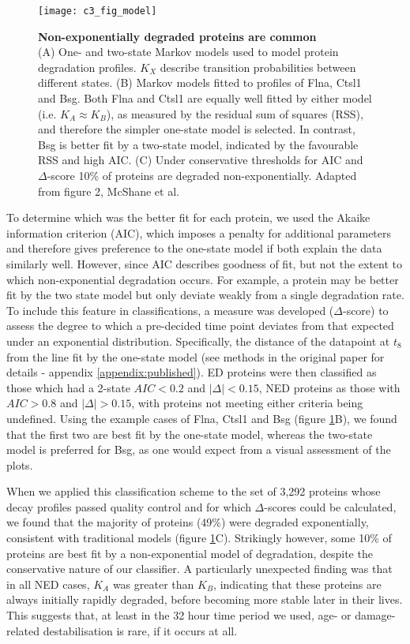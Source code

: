 \documentclass[a4paper,11pt,twoside,openright]{scrbook}
\begin{document}
\begin{figure}[h]
    \texttt{[image: c3\_fig\_model]}
    \caption[Non-exponentially degraded proteins are common]{\sffamily \textbf{Non-exponentially degraded proteins are common} \\ \small (A) One- and two-state Markov models used to model protein degradation profiles. $K_{X}$ describe transition probabilities between different states. (B) Markov models fitted to profiles of Flna, Ctsl1 and Bsg. Both Flna and Ctsl1 are equally well fitted by either model (i.e. $K_{A} \approx K_{B}$), as measured by the residual sum of squares (RSS), and therefore the simpler one-state model is selected. In contrast, Bsg is better fit by a two-state model, indicated by the favourable RSS and high AIC. (C) Under conservative thresholds for AIC and $\Delta$-score 10\% of proteins are degraded non-exponentially. Adapted from figure 2, McShane et al.\cite{McShane2016}}
    \label{figure:model}
\end{figure}

To determine which was the better fit for each protein, we used the Akaike information criterion \cite{Akaike1974} (AIC), which imposes a penalty for additional parameters and therefore gives preference to the one-state model if both explain the data similarly well. However, since AIC describes goodness of fit, but not the extent to which non-exponential degradation occurs. For example, a protein may be better fit by the two state model but only deviate weakly from a single degradation rate. To include this feature in classifications, a measure was developed ($\Delta$-score) to assess the degree to which a pre-decided time point deviates from that expected under an exponential distribution. Specifically, the distance of the datapoint at $t_{8}$ from the line fit by the one-state model (see methods in the original paper for details - appendix \ref{appendix:published}). ED proteins were then classified as those which had a 2-state $AIC < 0.2$ and $\lvert \Delta \rvert < 0.15$, NED proteins as those with $AIC > 0.8$ and $\lvert \Delta \rvert > 0.15$, with proteins not meeting either criteria being undefined. Using the example cases of Flna, Ctsl1 and Bsg (figure \ref{figure:model}B), we found that the first two are best fit by the one-state model, whereas the two-state model is preferred for Bsg, as one would expect from a visual assessment of the plots.

When we applied this classification scheme to the set of 3,292 proteins whose decay profiles passed quality control and for which $\Delta$-scores could be calculated, we found that the majority of proteins (49\%) were degraded exponentially, consistent with traditional models (figure \ref{figure:model}C). Strikingly however, some 10\% of proteins are best fit by a non-exponential model of degradation, despite the conservative nature of our classifier. A particularly unexpected finding was that in all NED cases, $K_{A}$ was greater than $K_{B}$, indicating that these proteins are always initially rapidly degraded, before becoming more stable later in their lives. This suggests that, at least in the 32 hour time period we used, age- or damage-related destabilisation is rare, if it occurs at all.
\end{document}
